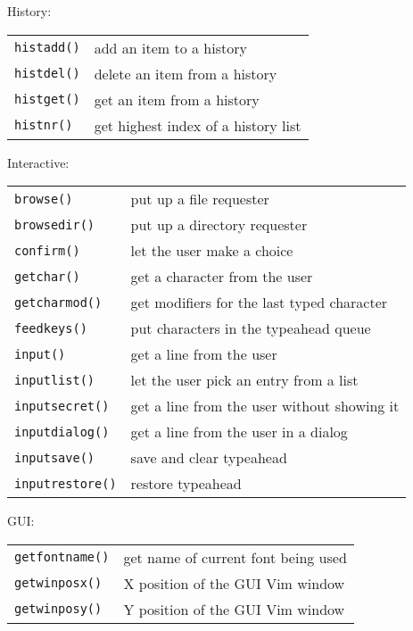 History:
\label{history-functions}
\begin{center} \begin{tabular}{l l}
				\verb!histadd()! & add an item to a history \\
				\verb!histdel()! & delete an item from a history \\
				\verb!histget()! & get an item from a history \\
				\verb!histnr()! & get highest index of a history list \\
\end{tabular} \end{center}

Interactive:
\label{interactive-functions}
\begin{center} \begin{tabular}{l l}
				\verb!browse()! & put up a file requester \\
				\verb!browsedir()! & put up a directory requester \\
				\verb!confirm()! & let the user make a choice \\
				\verb!getchar()! & get a character from the user \\
				\verb!getcharmod()! & get modifiers for the last typed character \\
				\verb!feedkeys()! & put characters in the typeahead queue \\
				\verb!input()! & get a line from the user \\
				\verb!inputlist()! & let the user pick an entry from a list \\
				\verb!inputsecret()! & get a line from the user without showing it \\
				\verb!inputdialog()! & get a line from the user in a dialog \\
				\verb!inputsave()! & save and clear typeahead \\
				\verb!inputrestore()! & restore typeahead \\
\end{tabular} \end{center}

GUI:
\label{gui-functions}
\begin{center} \begin{tabular}{l l}
				\verb!getfontname()! & get name of current font being used \\
				\verb!getwinposx()! & X position of the GUI Vim window \\
				\verb!getwinposy()! & Y position of the GUI Vim window \\
\end{tabular} \end{center}

